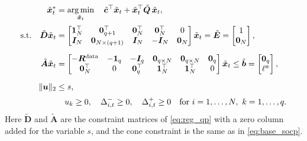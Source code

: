 \begin{equation} \label{eq:reg_socp}
\begin{aligned}
    \tilde{\bm{x}}_t^* &= \operatorname*{arg\,min}_{\tilde{\bm{x}}_t} \quad
    \tilde{\bm{c}}^\top \tilde{\bm{x}}_t + \tilde{\bm{x}}_t^\top \tilde{\bm{Q}}\, \tilde{\bm{x}}_t, \\[2pt]
    \text{s.t.} \quad
     \tilde{\bm{D}} \tilde{\bm{x}}_t &=
    \begin{bmatrix} \bm{1}_N^\top & \bm{0}_{q+1}^\top & \bm{0}_N^\top & \bm{0}_N^\top & 0 \\
    \bm{I}_N & \bm{0}_{N \times (q+1)} & \bm{I}_N & -\bm{I}_N & \bm{0}_N \end{bmatrix} \tilde{\bm{x}}_t
    = \tilde{\bm{E}} = \begin{bmatrix} 1 \\ \bm{0}_N \end{bmatrix}, \\[6pt]
     \tilde{\bm{A}} \tilde{\bm{x}}_t &=
    \begin{bmatrix} -\bm{R}^{\text{data}} & -\bm{1}_q & -\bm{I}_q & \bm{0}_{q \times N} & \bm{0}_{q \times N} & \bm{0}_q \\
    \bm{0}_N^\top & 0 & \bm{0}_q^\top & \bm{1}_N^\top & \bm{1}_N^\top & 0 \end{bmatrix} \tilde{\bm{x}}_t
    \le \tilde{\bm{b}} = \begin{bmatrix} \bm{0}_q \\ \ell^a \end{bmatrix}, \\[6pt]
     \|\bm{u}\|_2 &\le s, \\[2pt]
     & \quad u_k \ge 0,\quad \Delta_{i,t}^- \ge 0,\quad \Delta_{i,t}^+ \ge 0
    \quad \text{for } i = 1, \dots, N,\ k = 1, \dots, q.
\end{aligned}
\end{equation}
Here $\tilde{\bm{D}}$ and $\tilde{\bm{A}}$ are the constraint matrices of \eqref{eq:reg_qp} with a zero column added
for the variable $s$, and the cone constraint is the same as in \eqref{eq:base_socp}.

